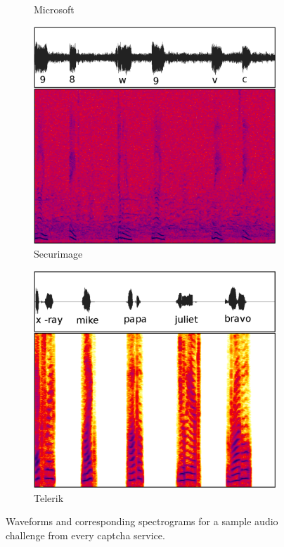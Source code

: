 \begin{figure}[tp]
\begin{subfigure}{0.3\textwidth}
        \caption{Microsoft}
        \label{fig:live}
\end{subfigure}\hspace{0.03\textwidth} 
\begin{subfigure}{0.3\textwidth}
        \includegraphics[width=\textwidth]{figures/secure.pdf}
        \caption{Securimage}
        \label{fig:secure}
\end{subfigure}\hspace{0.03\textwidth}
\begin{subfigure}{0.3\textwidth}
        \includegraphics[width=\textwidth]{figures/telerik.pdf}
        \caption{Telerik}
        \label{fig:telerik}
\end{subfigure}
\caption{Waveforms and corresponding spectrograms for a sample audio challenge from every captcha service.}
\label{fig:examples}
\end{figure}

